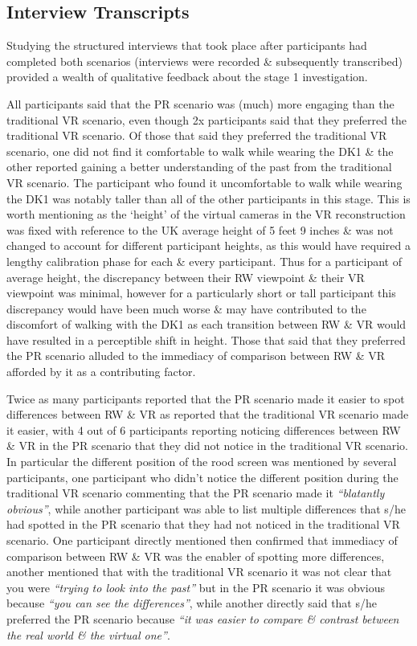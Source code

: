 
\subsection{Interview Transcripts}

Studying the structured interviews that took place after participants had completed both scenarios (interviews were recorded \& subsequently transcribed) provided a wealth of qualitative feedback about the stage 1 investigation.

All participants said that the PR scenario was (much) more engaging than the traditional VR scenario, even though 2x participants said that they preferred the traditional VR scenario. Of those that said they preferred the traditional VR scenario, one did not find it comfortable to walk while wearing the DK1 \& the other reported gaining a better understanding of the past from the traditional VR scenario. The participant who found it uncomfortable to walk while wearing the DK1 was notably taller than all of the other participants in this stage. This is worth mentioning as the `height' of the virtual cameras in the VR reconstruction was fixed with reference to the UK average height of 5 feet 9 inches \& was not changed to account for different participant heights, as this would have required a lengthy calibration phase for each \& every participant. Thus for a participant of average height, the discrepancy between their RW viewpoint \& their VR viewpoint was minimal, however for a particularly short or tall participant this discrepancy would have been much worse \& may have contributed to the discomfort of walking with the DK1 as each transition between RW \& VR would have resulted in a perceptible shift in height. Those that said that they preferred the PR scenario alluded to the immediacy of comparison between RW \& VR afforded by it as a contributing factor.

Twice as many participants reported that the PR scenario made it easier to spot differences between RW \& VR as reported that the traditional VR scenario made it easier, with 4 out of 6 participants reporting noticing differences between RW \& VR in the PR scenario that they did not notice in the traditional VR scenario. In particular the different position of the rood screen was mentioned by several participants, one participant who didn't notice the different position during the traditional VR scenario commenting that the PR scenario made it \textit{``blatantly obvious''}, while another participant was able to list multiple differences that s/he had spotted in the PR scenario that they had not noticed in the traditional VR scenario. One participant directly mentioned then confirmed that immediacy of comparison between RW \& VR was the enabler of spotting more differences, another mentioned that with the traditional VR scenario it was not clear that you were \textit{``trying to look into the past''} but in the PR scenario it was obvious because \textit{``you can see the differences''}, while another directly said that s/he preferred the PR scenario because \textit{``it was easier to compare \& contrast between the real world \& the virtual one''}.


